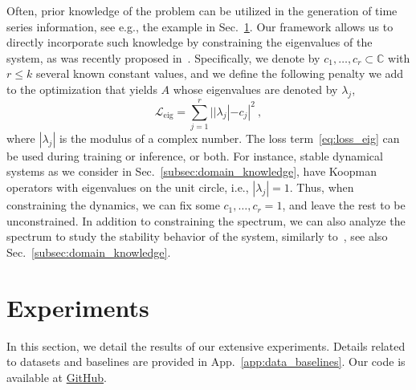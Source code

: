 \documentclass{article} %
\begin{document}
Often, prior knowledge of the problem can be utilized in the generation of time series information, see e.g., the example in Sec.~\ref{sec:results}. Our framework allows us to directly incorporate such knowledge by constraining the eigenvalues of the system, as was recently proposed in~\citep{berman2023multifactor}. Specifically, we denote by $c_1, \dots, c_r \subset \mathbb{C}$ with $r \leq k$ several known constant values, and we define the following penalty we add to the optimization that yields $A$ whose eigenvalues are denoted by $\lambda_j$,
\begin{equation} \label{eq:loss_eig}
    \mathcal{L}_\text{eig} = \sum_{j=1}^r | |\lambda_j| - c_j |^2 \ ,
\end{equation} 
where $|\lambda_j|$ is the modulus of a complex number. The loss term~\ref{eq:loss_eig} can be used during training or inference, or both. For instance, stable dynamical systems as we consider in Sec.~\ref{subsec:domain_knowledge}, have Koopman operators with eigenvalues on the unit circle, i.e., $| \lambda_j |= 1$. Thus, when constraining the dynamics, we can fix some $c_1, \dots, c_r = 1$, and leave the rest to be unconstrained. In addition to constraining the spectrum, we can also analyze the spectrum to study the stability behavior of the system, similarly to~\citep{erichson2019physics, naiman2023operator}, see also Sec.~\ref{subsec:domain_knowledge}.

\vspace{-1mm}
\section{Experiments}
\label{sec:results}

In this section, we detail the results of our extensive experiments. Details related to datasets and baselines are provided in App.~\ref{app:data_baselines}. Our code is available at \href{https://github.com/azencot-group/KoVAE}{GitHub}.
\end{document}
